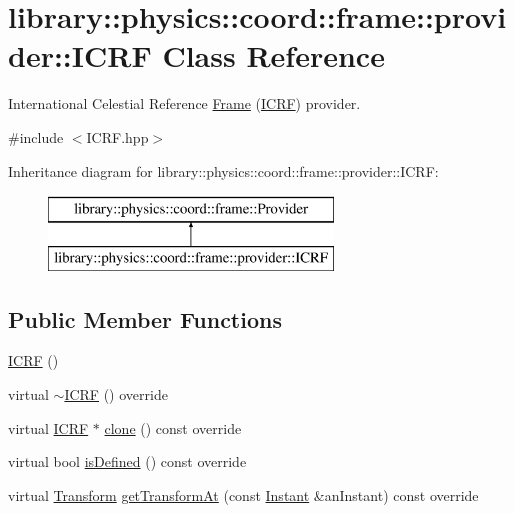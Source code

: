 \hypertarget{classlibrary_1_1physics_1_1coord_1_1frame_1_1provider_1_1_i_c_r_f}{}\section{library\+:\+:physics\+:\+:coord\+:\+:frame\+:\+:provider\+:\+:I\+C\+RF Class Reference}
\label{classlibrary_1_1physics_1_1coord_1_1frame_1_1provider_1_1_i_c_r_f}


International Celestial Reference \hyperlink{classlibrary_1_1physics_1_1coord_1_1_frame}{Frame} (\hyperlink{classlibrary_1_1physics_1_1coord_1_1frame_1_1provider_1_1_i_c_r_f}{I\+C\+RF}) provider.  




{\ttfamily \#include $<$I\+C\+R\+F.\+hpp$>$}

Inheritance diagram for library\+:\+:physics\+:\+:coord\+:\+:frame\+:\+:provider\+:\+:I\+C\+RF\+:\begin{figure}[H]
\begin{center}
\leavevmode
\includegraphics[height=2.000000cm]{classlibrary_1_1physics_1_1coord_1_1frame_1_1provider_1_1_i_c_r_f}
\end{center}
\end{figure}
\subsection*{Public Member Functions}
\begin{DoxyCompactItemize}
\item 
\hyperlink{classlibrary_1_1physics_1_1coord_1_1frame_1_1provider_1_1_i_c_r_f_a65d0457c6b892f83b14fa6f31eea0410}{I\+C\+RF} ()
\item 
virtual \hyperlink{classlibrary_1_1physics_1_1coord_1_1frame_1_1provider_1_1_i_c_r_f_a60159943ae7b049f5295d5ed656c4b78}{$\sim$\+I\+C\+RF} () override
\item 
virtual \hyperlink{classlibrary_1_1physics_1_1coord_1_1frame_1_1provider_1_1_i_c_r_f}{I\+C\+RF} $\ast$ \hyperlink{classlibrary_1_1physics_1_1coord_1_1frame_1_1provider_1_1_i_c_r_f_a06ce5c7c4bc22045d612d951cbeb4d14}{clone} () const override
\item 
virtual bool \hyperlink{classlibrary_1_1physics_1_1coord_1_1frame_1_1provider_1_1_i_c_r_f_a533e5d0240150b5c23080ee8bf89d040}{is\+Defined} () const override
\item 
virtual \hyperlink{classlibrary_1_1physics_1_1coord_1_1_transform}{Transform} \hyperlink{classlibrary_1_1physics_1_1coord_1_1frame_1_1provider_1_1_i_c_r_f_a6f5256cac7e8f7b1e947a9f6627a9a33}{get\+Transform\+At} (const \hyperlink{classlibrary_1_1physics_1_1time_1_1_instant}{Instant} \&an\+Instant) const override
\end{DoxyCompactItemize}


